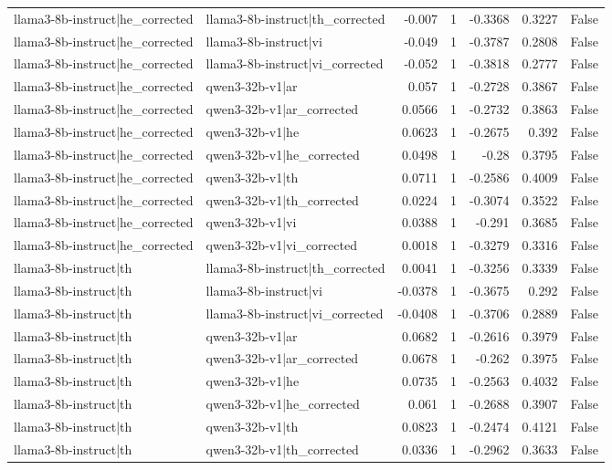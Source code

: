 \begin{table}
\begin{tabular}{l l r r r r l}
llama3-8b-instruct|he_corrected & llama3-8b-instruct|th_corrected & -0.007 & 1 & -0.3368 & 0.3227 & False \\
llama3-8b-instruct|he_corrected & llama3-8b-instruct|vi & -0.049 & 1 & -0.3787 & 0.2808 & False \\
llama3-8b-instruct|he_corrected & llama3-8b-instruct|vi_corrected & -0.052 & 1 & -0.3818 & 0.2777 & False \\
llama3-8b-instruct|he_corrected & qwen3-32b-v1|ar & 0.057 & 1 & -0.2728 & 0.3867 & False \\
llama3-8b-instruct|he_corrected & qwen3-32b-v1|ar_corrected & 0.0566 & 1 & -0.2732 & 0.3863 & False \\
llama3-8b-instruct|he_corrected & qwen3-32b-v1|he & 0.0623 & 1 & -0.2675 & 0.392 & False \\
llama3-8b-instruct|he_corrected & qwen3-32b-v1|he_corrected & 0.0498 & 1 & -0.28 & 0.3795 & False \\
llama3-8b-instruct|he_corrected & qwen3-32b-v1|th & 0.0711 & 1 & -0.2586 & 0.4009 & False \\
llama3-8b-instruct|he_corrected & qwen3-32b-v1|th_corrected & 0.0224 & 1 & -0.3074 & 0.3522 & False \\
llama3-8b-instruct|he_corrected & qwen3-32b-v1|vi & 0.0388 & 1 & -0.291 & 0.3685 & False \\
llama3-8b-instruct|he_corrected & qwen3-32b-v1|vi_corrected & 0.0018 & 1 & -0.3279 & 0.3316 & False \\
llama3-8b-instruct|th & llama3-8b-instruct|th_corrected & 0.0041 & 1 & -0.3256 & 0.3339 & False \\
llama3-8b-instruct|th & llama3-8b-instruct|vi & -0.0378 & 1 & -0.3675 & 0.292 & False \\
llama3-8b-instruct|th & llama3-8b-instruct|vi_corrected & -0.0408 & 1 & -0.3706 & 0.2889 & False \\
llama3-8b-instruct|th & qwen3-32b-v1|ar & 0.0682 & 1 & -0.2616 & 0.3979 & False \\
llama3-8b-instruct|th & qwen3-32b-v1|ar_corrected & 0.0678 & 1 & -0.262 & 0.3975 & False \\
llama3-8b-instruct|th & qwen3-32b-v1|he & 0.0735 & 1 & -0.2563 & 0.4032 & False \\
llama3-8b-instruct|th & qwen3-32b-v1|he_corrected & 0.061 & 1 & -0.2688 & 0.3907 & False \\
llama3-8b-instruct|th & qwen3-32b-v1|th & 0.0823 & 1 & -0.2474 & 0.4121 & False \\
llama3-8b-instruct|th & qwen3-32b-v1|th_corrected & 0.0336 & 1 & -0.2962 & 0.3633 & False \\

\end{tabular}
\end{table}
